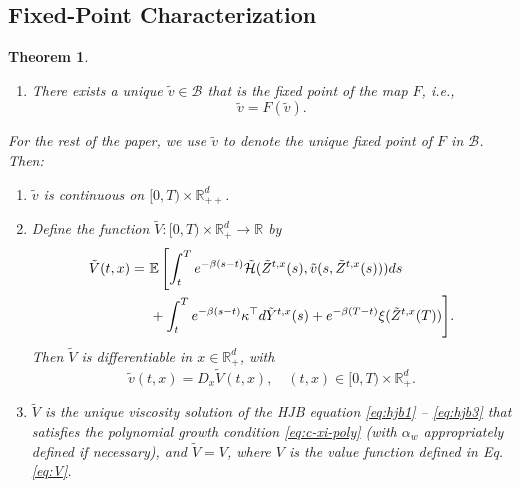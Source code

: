 \documentclass[11pt]{article}
\theoremstyle{definition}
\theoremstyle{plain}
\newtheorem{theorem}[assumption]{Theorem}
\newcommand{\R}{\mathbb{R}}
\newcommand{\cH}{{\cal H}}
\begin{document}
\subsection{Fixed-Point Characterization}
\begin{theorem}\label{thm:fixed-point-tildeV}
\begin{enumerate}
\item[(i)] There exists a unique \( \tilde{v} \in \mathcal{B} \) that is the fixed point of the map \( F \), 
i.e., 
\begin{equation}\label{eq:fixed-point-tildev}
  \tilde v = F(\tilde v).
\end{equation}
\end{enumerate}
For the rest of the paper, we use $\tilde v$ to denote the unique fixed point of $F$ in $\mathcal{B}$. Then: 
\begin{enumerate}
\item[(ii)] $\tilde v$ is continuous on $[0, T)\times \R_{++}^d$.
\item[(iii)] Define the function $\tilde V : [0, T)\times \R_+^d \to \R$ by
\begin{align}
  \tilde{V}(t,x) =&~\mathbb{E} \left[ \int_t^T e^{-\beta(s - t)} \tilde \cH(\tilde Z^{t,x}(s), \tilde{v}(s, \tilde Z^{t,x}(s))) ds \right. \nonumber\\
  &~+ \int_t^T e^{-\beta(s - t)} \kappa^{\top} d\tilde Y^{t,x}(s) + e^{-\beta(T - t)} \xi(\tilde Z^{t,x}(T)) \Bigg]. \label{eq:tildeV}
  \end{align}
Then $\tilde V$ is differentiable in $x\in \R_+^d$, with %
\[
\tilde{v}(t,x) = D_x \tilde{V}(t,x), \quad (t,x) \in [0,T) \times \mathbb{R}_+^d.
\]
\item[(iv)] $\tilde V$ is the unique viscosity solution of the HJB equation \eqref{eq:hjb1} -- \eqref{eq:hjb3} 
that satisfies the polynomial growth condition \eqref{eq:c-xi-poly} (with $\alpha_w$ appropriately defined if necessary), 
and $\tilde V = V$, 
where $V$ is the value function defined in Eq. \eqref{eq:V}.
\end{enumerate}
\end{theorem}
\end{document}
